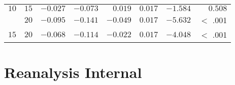 \begin{table}[htbp]
{\begin{tabular}{lrrrrrrr}
							$10$                 & $15$                 & $-0.027$             & $-0.073$                                        & $0.019$              & $0.017$              & $-1.584$             & $0.508$     \\
							$ $                  & $20$                 & $-0.095$             & $-0.141$                                        & $-0.049$             & $0.017$              & $-5.632$             & $<$ .001    \\
							$15$                 & $20$                 & $-0.068$             & $-0.114$                                        & $-0.022$             & $0.017$              & $-4.048$             & $<$ .001    \\
							\bottomrule
				\end{tabular}
	}
\end{table}

\section{Reanalysis Internal}\label{app:statistical_analysis:bhh_variant_reanalysis}


